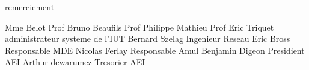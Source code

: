 remerciement



Mme Belot Prof
Bruno Beaufils Prof
Philippe Mathieu Prof
Eric Triquet  administrateur systeme de l'IUT
Bernard Szelag Ingenieur Reseau
Eric Bross Responsable MDE
Nicolas Ferlay Responsable Amul
Benjamin Digeon Presidient AEI
Arthur dewarumez Tresorier AEI
